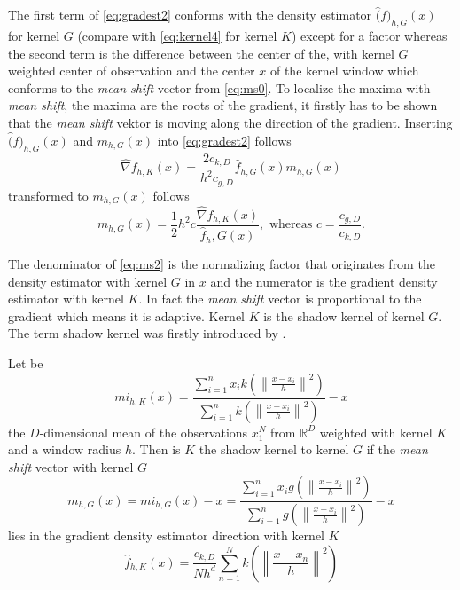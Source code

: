 The first term of \autoref{eq:gradest2} conforms with the density estimator
$\hat(f)_{h,G}(x)$ for kernel $G$ (compare with \autoref{eq:kernel4} for kernel
$K$) except for a factor whereas the second term is the difference between the
center of the, with kernel $G$ weighted center of observation and the center $x$
of the kernel window which conforms to the \emph{mean shift} vector from 
\autoref{eq:ms0}.
To localize the maxima with \emph{mean shift}, the maxima are the roots of the gradient,
it firstly has to be shown that the \emph{mean shift} vektor is moving along the 
direction of the gradient. Inserting $\hat(f)_{h,G}(x)$ and $m_{h,G}(x)$ into
\autoref{eq:gradest2} follows
\begin{equation}\label{eq:ms1}
	\hat{\nabla} f_{h,K}(x) = \frac{2c_{k,D}}{h^2c_{g,D}} 
	\hat{f}_{h,G}(x)m_{h,G}(x)
\end{equation}
transformed to $m_{h,G}(x)$ follows
\begin{equation}\label{eq:ms2}
	m_{h,G}(x) = \frac{1}{2}h^2 c 
	\frac{\hat{\nabla} f_{h,K}(x)}{\hat{f}_h,G(x)}, \textrm{ whereas } 
	c = \frac{c_{g,D}}{c_{k,D}}.
\end{equation}

The denominator of \autoref{eq:ms2} is the normalizing factor that originates 
from the density estimator with kernel $G$ in $x$ and the numerator is the 
gradient density estimator with kernel $K$. In fact the \emph{mean shift} vector
is proportional to the gradient which means it is adaptive. Kernel $K$ is the 
shadow kernel of kernel $G$. The term shadow kernel was firstly introduced by
\citeauthor{citeulike:2522867} \citep{citeulike:2522867}.

Let be
\begin{equation}\label{eq:msi}
	mi_{h,K}(x) = \frac{\sum_{i=1}^n x_i k\left(\left\lVert \frac{x - x_i}{h}
	\right\rVert^2\right)}{\sum_{i=1}^n k\left(\left\lVert \frac{x - x_i}{h}
	\right\rVert^2\right)} -x
\end{equation}
the $D$-dimensional mean of the observations $x_1^N$ from $\mathbb{R}^D$ 
weighted with kernel $K$ and a window radius $h$. Then is $K$ the 
shadow kernel to kernel $G$ if the \emph{mean shift} vector with kernel $G$
\begin{equation}\label{eq:msi2}	
	m_{h,G}(x) = mi_{h,G}(x) - x = 
	\frac{\sum_{i=1}^n x_i g\left(\left\lVert \frac{x - x_i}{h}
	\right\rVert^2\right)}{\sum_{i=1}^n g\left(\left\lVert \frac{x - x_i}{h}
	\right\rVert^2\right)} -x
\end{equation}
lies in the gradient density estimator direction with kernel $K$
\begin{equation}\label{eq:msi3}
	\hat{f}_{h,K}(x) = \frac{c_{k,D}}{Nh^d}
	\sum_{n = 1}^N k\left(\left\lVert \frac{x-x_n}{h} \right\rVert^2\right)
\end{equation}

